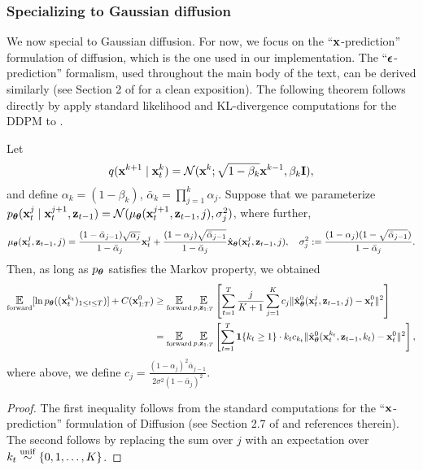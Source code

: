\subsubsection{Specializing to Gaussian diffusion}
We now special  to Gaussian diffusion. For now, we focus on the ``$\mathbf{x}$-prediction'' formulation of diffusion, which is the one used in our implementation. The ``$\bm{\epsilon}$-prediction'' formalism, used throughout the main body of the text, can be derived similarly (see Section 2 of \cite{chan2024tutorial} for a clean exposition). The following theorem follows directly by apply standard likelihood and KL-divergence computations for the DDPM \cite{ho2020denoising,chan2024tutorial} to .  
\newcommand{\xthet}{\hat{\bx}_{\bm\theta}}
\begin{corollary}\label{cor:elbo} Let 
\begin{align}
q(\mathbf{x}^{k+1} \mid \mathbf{x}_t^k) = \mathcal{N}(\mathbf{x}^k; \sqrt{1-\beta_k}\mathbf{x}^{k-1}, \beta_k \mathbf{I}),
\end{align}
and define $\alpha_k = (1-\beta_k)$, $\bar{\alpha}_k = \prod_{j=1}^k \alpha_j$.  Suppose that we parameterize $p_{\bm{\theta}}(\mathbf{x}_{t}^{j} \mid \mathbf{x}_{t}^{j+1},\mathbf{z}_{t-1}) = \mathcal{N}(\mu_{\bm{\theta}}(\mathbf{x}_{t}^{j+1},\mathbf{z}_{t-1},j),\sigma_j^2)$, where further, 
\begin{align*}
\mutheta(\bx_{t}^{j},\bz_{t-1},j) = \frac{(1 - \bar{\alpha}_{j-1})\sqrt{{\alpha}_j}}{1-\bar{\alpha}_j} \bx_t^j +  \frac{(1 - {\alpha}_{j})\sqrt{\bar{\alpha}_{j-1}}}{1-\bar{\alpha}_j}\xthet(\bx_{t}^{j},\bz_{t-1},j), \quad \sigma_j^2 := \frac{(1 - \alpha_{j})(1-\sqrt{\bar{\alpha}_{j-1}})}{1-\bar{\alpha}_j}.
\end{align*}
 Then, as long as $p_{\bm{\theta}}$ satisfies the Markov property, we obtained
\begin{align*}
\Eforward[\ln  \ptheta((\bx_{t}^{k_t})_{1 \le t \le T})] + C(\bx_{1:T}^0)  &\ge \Eforward\Epz \left[\sum_{t=1}^T  \frac{j}{K+1}\sum_{j=1}^{K}c_j \| \hat{\bx}^0_{\bm{\theta}}(\bx_{t}^{j},\bz_{t-1},j) - \bx_t^0\|^2 \right]\\
&= \Eforward\Epz \left[\sum_{t=1}^T  \I\{k_t \ge 1\}\cdot k_tc_{k_t} \| \hat{\bx}^0_{\bm{\theta}}(\bx_{t}^{k_t},\bz_{t-1},{k_t}) - \bx_t^0\|^2 \right],
\end{align*}
where above, we define $c_j = \frac{(1 - \alpha_{j})^2\bar{\alpha}_{j-1}}{2\sigma^2(1 - \bar\alpha_{j})^2}$.
\end{corollary}
\begin{proof} The first inequality follows from the standard computations for the ``$\mathbf{x}$-prediction'' formulation of Diffusion (see Section 2.7 of  \cite{chan2024tutorial} and references therein). The second follows by replacing the sum over $j$ with an expectation over $k_t \overset{\mathrm{unif}}{\sim} \{0,1,\dots,K\}$. 
\end{proof}
